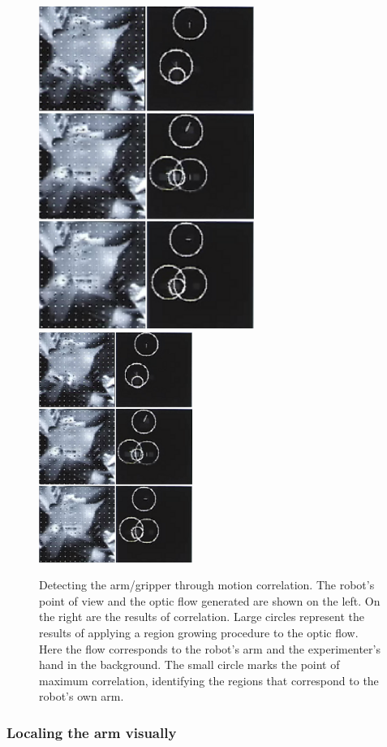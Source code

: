 \begin{figure}[tb]
\begin{center}
\ifrevised
\includegraphics[width=7cm]{arm-detection2.eps}
\else
\includegraphics[width=5cm]{arm-detection2.eps}
\fi
\caption{ 
\label{fig:arm-detection}
%
Detecting the arm/gripper through motion correlation. The robot's
point of view and the optic flow generated are shown on the left. On
the right are the results of correlation.  Large circles represent the
results of applying a region growing procedure to the optic flow.
Here the flow corresponds to the robot's arm and the experimenter's
hand in the background. The small circle marks the point of maximum 
correlation, identifying the regions that correspond to the robot's own arm.
%
}
\end{center}
\end{figure}


\subsubsection*{Local\iz{}ing the arm visually}


